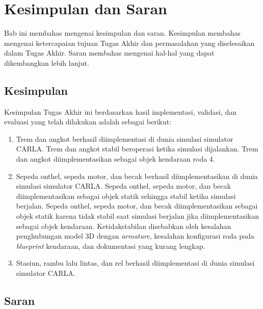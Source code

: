 \chapter{Kesimpulan dan Saran}

Bab ini membahas mengenai kesimpulan dan saran. Kesimpulan membahas mengenai
ketercapaian tujuan Tugas Akhir dan permasalahan yang diselesaikan dalam Tugas
Akhir. Saran membahas mengenai hal-hal yang dapat dikembangkan lebih lanjut.

\section{Kesimpulan}

Kesimpulan Tugas Akhir ini berdasarkan hasil implementasi, validasi, dan
evaluasi yang telah dilakukan adalah sebagai berikut:

\begin{enumerate}
	\item Trem dan angkot berhasil diimplementasi di dunia simulasi simulator
	CARLA. Trem dan angkot stabil beroperasi ketika simulasi dijalankan. Trem
	dan angkot diimplementasikan sebagai objek kendaraan roda 4.

	\item Sepeda onthel, sepeda motor, dan becak berhasil diimplementasikan di
	dunia simulasi simulator CARLA. Sepeda onthel, sepeda motor, dan becak
	diimplementasikan sebagai objek statik sehingga stabil ketika simulasi
	berjalan. Sepeda onthel, sepeda motor, dan becak diimplementasikan sebagai
	objek statik karena tidak stabil saat simulasi berjalan jika
	diimplementasikan sebagai objek kendaraan. Ketidakstabilan disebabkan oleh
	kesalahan penghubungan model 3D dengan \textit{armature}, kesalahan
	konfigurasi roda pada \textit{blueprint} kendaraan, dan dokumentasi yang
	kurang lengkap.

	\item Stasiun, rambu lalu lintas, dan rel berhasil diimplementasi di
	dunia simulasi simulator CARLA.


\end{enumerate}

\section{Saran}

